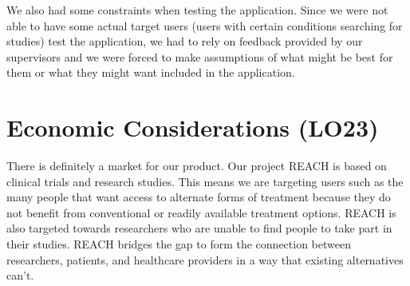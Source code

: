 \documentclass{article}
\begin{document}
We also had some constraints when testing the application. Since we were not able to have some actual 
target users (users with certain conditions searching for studies) test the application, we had to 
rely on feedback provided by our supervisors and we were forced to make assumptions of what might be 
best for them or what they might want included in the application.

\section{Economic Considerations (LO23)}


There is definitely a market for our product. Our project REACH is based on clinical trials and 
research studies. This means we are targeting users such as the many people that want access to 
alternate forms of treatment because they do not benefit from conventional or readily available 
treatment options. REACH is also targeted towards researchers who are unable to find people to take 
part in their studies. REACH bridges the gap to form the connection between researchers, patients, 
and healthcare providers in a way that existing alternatives can't.\\
\end{document}

